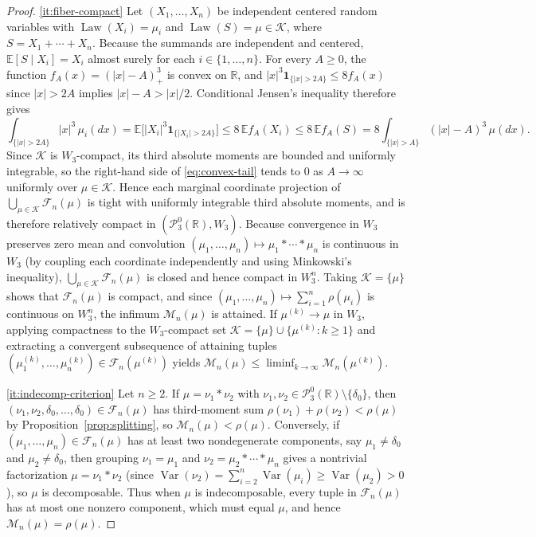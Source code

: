 \documentclass[11pt]{article}
\numberwithin{equation}{section}
\theoremstyle{definition}
\theoremstyle{remark}
\DeclareMathOperator{\Var}{Var}
\DeclareMathOperator{\Law}{Law}
\newcommand{\E}{\mathbb E}
\newcommand{\R}{\mathbb R}
\newcommand{\ind}{\mathbf1}
\begin{document}
\begin{proof}
\ref{it:fiber-compact} Let $(X_1,\ldots,X_n)$ be independent centered random
variables with $\Law(X_i)=\mu_i$ and $\Law(S)=\mu\in\mathcal K$, where
$S=X_1+\cdots+X_n$. Because the summands are independent and centered,
$\E[S\mid X_i]=X_i$ almost surely for each $i\in\{1,\ldots,n\}$. For every
$A\ge0$, the function $f_A(x)=(|x|-A)_+^3$ is convex on $\R$, and
$|x|^3\ind_{\{|x|>2A\}}\le8f_A(x)$ since $|x|>2A$ implies $|x|-A>|x|/2$.
Conditional Jensen's inequality therefore gives
\begin{equation}\label{eq:convex-tail}
 \int_{\{|x|>2A\}}|x|^3\,\mu_i(dx)
 =\E\bigl[|X_i|^3\ind_{\{|X_i|>2A\}}\bigr]
 \le 8\,\E f_A(X_i)\le 8\,\E f_A(S)
 =8\int_{\{|x|>A\}}(|x|-A)^3\,\mu(dx).
\end{equation}
Since $\mathcal K$ is $W_3$-compact, its third absolute moments are bounded
and uniformly integrable, so the right-hand side of \eqref{eq:convex-tail}
tends to $0$ as $A\to\infty$ uniformly over $\mu\in\mathcal K$. Hence each
marginal coordinate projection of $\bigcup_{\mu\in\mathcal K}\mathcal F_n(\mu)$
is tight with uniformly integrable third absolute moments, and is therefore
relatively compact in $(\mathcal P_3^0(\R),W_3)$. Because convergence in
$W_3$ preserves zero mean and convolution $(\mu_1,\ldots,\mu_n)\mapsto\mu_1*\cdots*\mu_n$
is continuous in $W_3$ (by coupling each coordinate independently and using
Minkowski's inequality), $\bigcup_{\mu\in\mathcal K}\mathcal F_n(\mu)$ is
closed and hence compact in $W_3^n$. Taking $\mathcal K=\{\mu\}$ shows that
$\mathcal F_n(\mu)$ is compact, and since $(\mu_1,\ldots,\mu_n)\mapsto\sum_{i=1}^n\rho(\mu_i)$
is continuous on $W_3^n$, the infimum $\mathcal M_n(\mu)$ is attained. If
$\mu^{(k)}\to\mu$ in $W_3$, applying compactness to the $W_3$-compact set
$\mathcal K=\{\mu\}\cup\{\mu^{(k)}:k\ge1\}$ and extracting a convergent
subsequence of attaining tuples $(\mu_1^{(k)},\ldots,\mu_n^{(k)})\in\mathcal F_n(\mu^{(k)})$
yields $\mathcal M_n(\mu)\le\liminf_{k\to\infty}\mathcal M_n(\mu^{(k)})$.

\ref{it:indecomp-criterion} Let $n\ge2$. If $\mu=\nu_1*\nu_2$ with
$\nu_1,\nu_2\in\mathcal P_3^0(\R)\setminus\{\delta_0\}$, then
$(\nu_1,\nu_2,\delta_0,\ldots,\delta_0)\in\mathcal F_n(\mu)$ has third-moment
sum $\rho(\nu_1)+\rho(\nu_2)<\rho(\mu)$ by Proposition~\ref{prop:splitting},
so $\mathcal M_n(\mu)<\rho(\mu)$. Conversely, if $(\mu_1,\ldots,\mu_n)\in\mathcal F_n(\mu)$
has at least two nondegenerate components, say $\mu_1\ne\delta_0$ and
$\mu_2\ne\delta_0$, then grouping $\nu_1=\mu_1$ and
$\nu_2=\mu_2*\cdots*\mu_n$ gives a nontrivial factorization $\mu=\nu_1*\nu_2$
(since $\Var(\nu_2)=\sum_{i=2}^n\Var(\mu_i)\ge\Var(\mu_2)>0$), so $\mu$ is
decomposable. Thus when $\mu$ is indecomposable, every tuple in
$\mathcal F_n(\mu)$ has at most one nonzero component, which must equal $\mu$,
and hence $\mathcal M_n(\mu)=\rho(\mu)$.


\end{proof}
\end{document}
